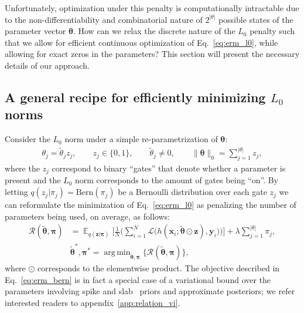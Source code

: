 \documentclass{article} %
\DeclareMathOperator{\E}{\mathbb{E}}
\def\!#1{\boldsymbol{#1}}
\def\*#1{\mathbf{#1}}
\DeclareMathOperator*{\argmin}{arg\,min}
\begin{document}
Unfortunately, optimization under this penalty is computationally intractable due to the non-differentiability and combinatorial nature of $2^{|\theta|}$ possible states of the parameter vector $\!\theta$.  How can we relax the discrete nature of the $L_0$ penalty such that we allow for efficient continuous optimization of Eq.~\ref{eq:erm_l0}, while allowing for exact zeros in the parameters? This section will present the necessary details of our approach. 

\subsection{A general recipe for efficiently minimizing $L_0$ norms}\label{sec:eff_min_l0}
Consider the $L_0$ norm under a simple re-parametrization of $\!\theta$:
\begin{align}
	\theta_j = \tilde{\theta}_j z_j, \qquad z_j \in \{0, 1\}, \qquad \tilde{\theta}_j \neq 0, \qquad \|\!\theta\|_0 =  \sum_{j=1}^{|\theta|}z_j,
\end{align}
where the $z_j$ correspond to binary ``gates'' that denote whether a parameter is present and the $L_0$ norm corresponds to the amount of gates being ``on''. By letting $q(z_j|\pi_j) = \text{Bern}(\pi_j)$ be a Bernoulli distribution over each gate $z_j$ we can reformulate the minimization of Eq.~\ref{eq:erm_l0} as penalizing the number of parameters being used, on average, as follows:
\begin{align}
	\mathcal{R}(\tilde{\!\theta}, \!\pi) &
	 = \E_{q(\*z|\!\pi)}\bigg[\frac{1}{N}\bigg(\sum_{i=1}^{N}\mathcal{L}\big(h(\*x_i; \tilde{\!\theta}\odot\*z), \*y_i\big)\bigg)\bigg] + \lambda \sum_{j=1}^{|\theta|}\pi_j,\label{eq:erm_bern}\\
	& \tilde{\!\theta}^*, \!\pi^* = \argmin_{\tilde{\!\theta}, \!\pi}\{\mathcal{R}(\tilde{\!\theta}, \!\pi)\}\nonumber,
\end{align}
where $\odot$ corresponds to the elementwise product. The objective described in Eq.~\ref{eq:erm_bern} is in fact a special case of a variational bound over the parameters involving spike and slab~\citep{mitchell1988bayesian} priors and approximate posteriors; we refer interested readers to appendix~\ref{app:relation_vi}. 
\end{document}
